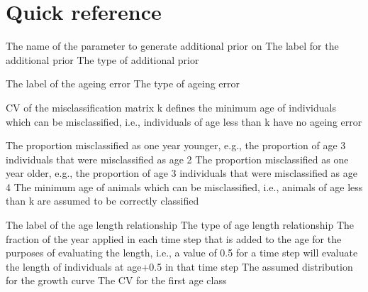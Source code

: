 \section{Quick reference\label{sec:quick-reference}}
\par
{} {The name of the parameter to generate additional prior on}
 {The label for the additional prior}
 {The type of additional prior}
\par\par
{} {The label of the ageing error}
 {The type of ageing error}
\par\textbf{}\par
\par\textbf{}\par
\par\textbf{}\par
{} {CV of the misclassification matrix}
 {k defines the minimum age of individuals which can be misclassified, i.e., individuals of age less than k have no ageing error}
\par\textbf{}\par
{} {The proportion misclassified as one year younger, e.g., the proportion of age 3 individuals that were misclassified as age 2}
 {The proportion misclassified as one year older, e.g., the proportion of age 3 individuals that were misclassified as age 4}
 {The minimum age of animals which can be misclassified, i.e., animals of age less than k are assumed to be correctly classified}
\par\par
{} {The label of the age length relationship}
 {The type of age length relationship}
 {The fraction of the year applied in each time step that is added to the age for the purposes of evaluating the length, i.e., a value of 0.5 for a time step will evaluate the length of individuals at age+0.5 in that time step}
 {The assumed distribution for the growth curve}
 {The CV for the first age class}
